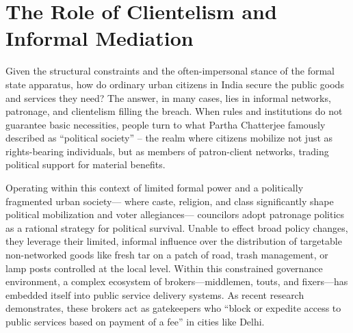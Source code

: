 \section{The Role of Clientelism and Informal Mediation}

Given the structural constraints and the often-impersonal stance of the formal state apparatus, how do ordinary urban citizens in India secure the public goods and services they need? The answer, in many cases, lies in informal networks, patronage, and clientelism filling the breach. When rules and institutions do not guarantee basic necessities, people turn to what Partha Chatterjee famously described as ``political society'' – the realm where citizens mobilize not just as rights-bearing individuals, but as members of patron-client networks, trading political support for material benefits.

Operating within this context of limited formal power and a politically fragmented urban society— where caste, religion, and class significantly shape political mobilization and voter allegiances— councilors adopt patronage politics as a rational strategy for political survival. Unable to effect broad policy changes, they leverage their limited, informal influence over the distribution of targetable non-networked goods like fresh tar on a patch of road, trash management, or lamp posts controlled at the local level. Within this constrained governance environment, a complex ecosystem of brokers—middlemen, touts, and fixers—has embedded itself into public service delivery systems. As recent research demonstrates, these brokers act as gatekeepers who ``block or expedite access to public services based on payment of a fee'' in cities like Delhi.

